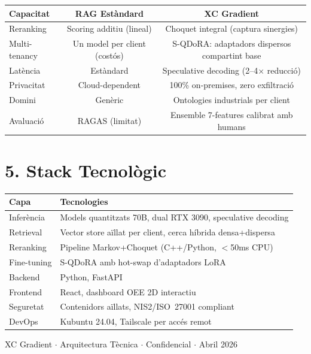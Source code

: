 \documentclass[11pt,a4paper]{article}
\begin{document}
\begin{center}
\renewcommand{\arraystretch}{1.3}
\begin{tabularx}{0.92\textwidth}{X c c}
\toprule
\textbf{Capacitat} & \textbf{RAG Estàndard} & \textbf{XC Gradient} \\
\midrule
Reranking & Scoring additiu (lineal) & Choquet integral (captura sinergies) \\
Multi-tenancy & Un model per client (costós) & S-QDoRA: adaptadors dispersos compartint base \\
Latència & Estàndard & Speculative decoding (2--4$\times$ reducció) \\
Privacitat & Cloud-dependent & 100\% on-premises, zero exfiltració \\
Domini & Genèric & Ontologies industrials per client \\
Avaluació & RAGAS (limitat) & Ensemble 7-features calibrat amb humans \\
\bottomrule
\end{tabularx}
\end{center}

\section{5. Stack Tecnològic}

\begin{center}
\renewcommand{\arraystretch}{1.2}
\small
\begin{tabularx}{0.92\textwidth}{l X}
\toprule
\textbf{Capa} & \textbf{Tecnologies} \\
\midrule
Inferència & Models quantitzats 70B, dual RTX 3090, speculative decoding \\
Retrieval & Vector store aïllat per client, cerca híbrida densa+dispersa \\
Reranking & Pipeline Markov+Choquet (C++/Python, $<$50ms CPU) \\
Fine-tuning & S-QDoRA amb hot-swap d'adaptadors LoRA \\
Backend & Python, FastAPI \\
Frontend & React, dashboard OEE 2D interactiu \\
Seguretat & Contenidors aïllats, NIS2/ISO~27001 compliant \\
DevOps & Kubuntu 24.04, Tailscale per accés remot \\
\bottomrule
\end{tabularx}
\end{center}

\vfill
\begin{center}
\small\textcolor{midgray}{XC Gradient $\cdot$ Arquitectura Tècnica $\cdot$ Confidencial $\cdot$ Abril 2026}
\end{center}
\end{document}
